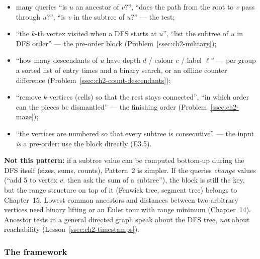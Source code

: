 \begin{itemize}[leftmargin=*]
    \item many queries ``is $u$ an ancestor of $v$?'', ``does the path from the root to $v$ pass through $u$?'', ``is $v$ in the subtree of $u$?'' --- the  test;
    \item ``the $k$-th vertex visited when a DFS starts at $u$'', ``list the subtree of $u$ in DFS order'' --- the pre-order block (Problem~\ref{ssec:ch2-military});
    \item ``how many descendants of $u$ have depth $d$ / colour $c$ / label $\ell$'' --- per group a sorted list of entry times and a binary search, or an offline counter difference (Problem~\ref{ssec:ch2-count-descendants});
    \item ``remove $k$ vertices (cells) so that the rest stays connected'', ``in which order can the pieces be dismantled'' --- the finishing order (Problem~\ref{ssec:ch2-maze});
    \item ``the vertices are numbered so that every subtree is consecutive'' --- the input \emph{is} a pre-order: use the block directly (E3.5).
\end{itemize}
\textbf{Not this pattern:} if a subtree value can be computed bottom-up during the DFS itself (sizes, sums, counts), Pattern~2 is simpler. If the queries \emph{change} values (``add 5 to vertex $v$, then ask the sum of a subtree''), the block is still the key, but the range structure on top of it (Fenwick tree, segment tree) belongs to Chapter~15. Lowest common ancestors and distances between two arbitrary vertices need binary lifting or an Euler tour with range minimum (Chapter~14). Ancestor tests in a general directed graph speak about the DFS tree, \emph{not} about reachability (Lesson~\ref{ssec:ch2-timestamps}).

\subsubsection*{The framework}

